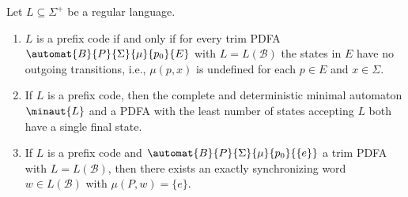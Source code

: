 \begin{proposition}
	\label{constr_sync:prop:aut_prefix_free}
	\label{constr_sync:prop:aut_prefix_free_exact_sync}
	Let $L \subseteq \Sigma^+$ be a regular language.
	
	\begin{enumerate}
		\item \label{constr_sync:prop:aut_prefix_free:item:trim} $L$ is a prefix code if and only if for every trim PDFA $\automat{B}{P}{\Sigma}{\mu}{p_0}{E}$
		with $L = L(\mathcal B)$ the states in $E$ have no outgoing transitions, i.e., $\mu(p, x)$ is undefined
		for each $p \in E$ and $x \in \Sigma$.
		
		\item  \label{constr_sync:prop:aut_prefix_free:item:min} If $L$ is a prefix code, then the complete and deterministic minimal automaton $\minaut{L}$
		and a PDFA with the least number of states accepting $L$
		both have a single final state.
		
		\item  \label{constr_sync:prop:aut_prefix_free:item:sync} If $L$ is a prefix code and $\automat{B}{P}{\Sigma}{\mu}{p_0}{\{e\}}$ a  trim PDFA 
		with $L = L(\mathcal B)$, 
		then there exists an exactly synchronizing word $w \in L(\mathcal B)$
		with $\mu(P, w) = \{e\}$.
	\end{enumerate}
\end{proposition} 
